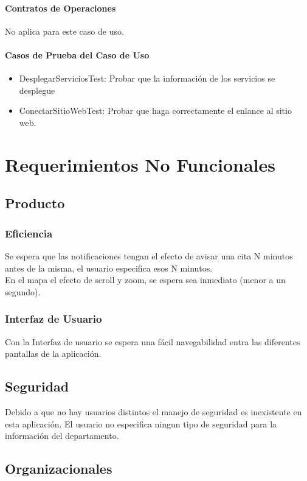 \documentclass[12pt]{article}
\begin{document}
\paragraph{Contratos de Operaciones}
No aplica para este caso de uso.
\paragraph{Casos de Prueba del Caso de Uso}
\begin{itemize}
	\item{DesplegarServiciosTest: Probar que la informaci\'on de los servicios se desplegue }
	\item{ConectarSitioWebTest: Probar que haga correctamente el enlance al sitio web.}
\end{itemize}

\newpage
\section{Requerimientos No Funcionales}

\subsection{Producto}
\subsubsection{Eficiencia}
Se espera que las notificaciones tengan el efecto de avisar una cita N minutos antes de la misma, el usuario especifica esos N minutos.\\ 
En el mapa el efecto de scroll y zoom, se espera sea inmediato (menor a un segundo).

\subsubsection{Interfaz de Usuario}
Con la Interfaz de usuario se espera una f\'acil navegabilidad entra las diferentes pantallas de la aplicaci\'on.


\subsection{Seguridad}
Debido a que no hay usuarios distintos el manejo de seguridad es inexistente en esta aplicaci\'on. El usuario no especifica ningun tipo de seguridad para la informaci\'on del departamento.

\subsection{Organizacionales}
\end{document}
